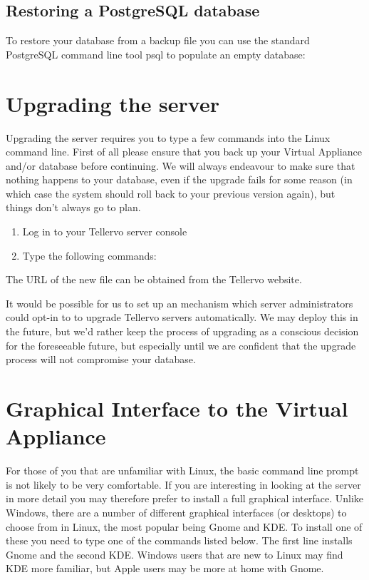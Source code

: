 \subsection{Restoring a PostgreSQL database}
To restore your database from a backup file you can use the standard PostgreSQL command line tool psql to populate an empty database:




\section{Upgrading the server}
Upgrading the server requires you to type a few commands into the Linux command line.  First of all please ensure that you back up your Virtual Appliance and/or database before continuing.  We will always endeavour to make sure that nothing happens to your database, even if the upgrade fails for some reason (in which case the system should roll back to your previous version again), but things don't always go to plan.

\begin{enumerate}
 \item Log in to your Tellervo server console 
 \item Type the following commands: 
\end{enumerate}

The URL of the new file can be obtained from the Tellervo website.  

It would be possible for us to set up an mechanism which server administrators could opt-in to to upgrade Tellervo servers automatically.  We may deploy this in the future, but we'd rather keep the process of upgrading as a conscious decision for the foreseeable future, but especially until we are confident that the upgrade process will not compromise your database.


\section{Graphical Interface to the Virtual Appliance}
For those of you that are unfamiliar with Linux, the basic command line prompt is not likely to be very comfortable.  If you are interesting in looking at the server in more detail you may therefore prefer to install a full graphical interface.  Unlike Windows, there are a number of different graphical interfaces (or desktops) to choose from in Linux, the most popular being Gnome and KDE.  To install one of these you need to type one of the commands listed below.  The first line installs Gnome and the second KDE. Windows users that are new to Linux may find KDE more familiar, but Apple users may be more at home with Gnome.

